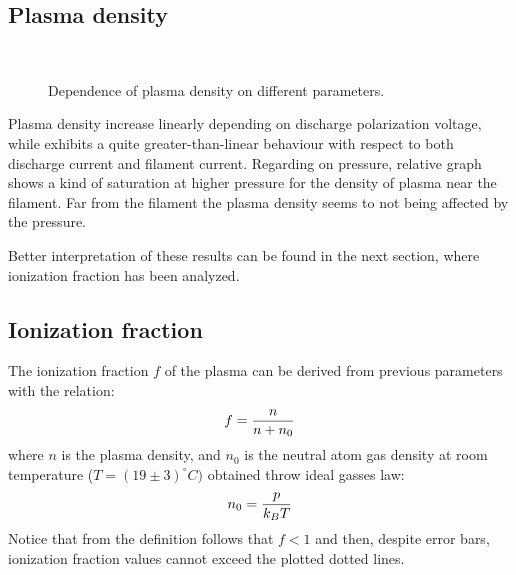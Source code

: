 \documentclass[11pt,a4 paper]{article}
\let\oldfrac\frac
\renewcommand{\frac}[3][d]{\ifthenelse{\equal{#1}{d}}{\oldfrac{#2}{#3}}{\nicefrac{#2}{#3}}}
\begin{document}
\subsection{Plasma density}
\begin{figure}[H]
\\%
 \caption{Dependence of plasma density on different parameters.}\label{fig:n}%
\end{figure}%
Plasma density increase linearly depending on discharge polarization voltage, while exhibits a quite greater-than-linear behaviour with respect to both discharge current and filament current. Regarding on pressure, relative graph shows a kind of saturation at higher pressure for the density of plasma near the filament. Far from the filament the plasma density seems to not being affected by the pressure.

Better interpretation of these results can be found in the next section, where ionization fraction has been analyzed.


\subsection{Ionization fraction}
The ionization fraction $f$ of the plasma can be derived from previous parameters with the relation:
\[f=\frac n{n+n_0}\]
where $n$ is the plasma density, and $n_0$ is the neutral atom gas density at room temperature ($T=(19\pm3)^\circ C)$ obtained throw ideal gasses law:
\[n_0=\frac p{k_BT}\]
Notice that from the definition follows that $f<1$ and then, despite error bars, ionization fraction values cannot exceed the plotted dotted lines.
\end{document}
